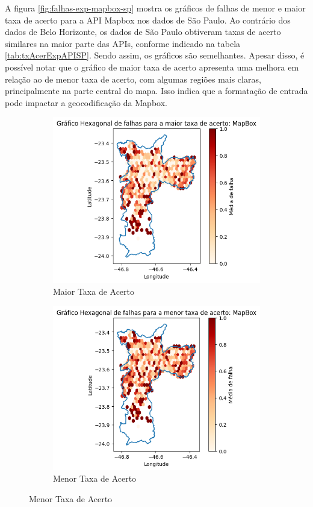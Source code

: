 A figura \ref{fig:falhas-exp-mapbox-sp} mostra os gráficos de falhas de menor e maior taxa de acerto para a API Mapbox nos dados de São Paulo. Ao contrário dos dados de Belo Horizonte, os dados de São Paulo obtiveram taxas de acerto similares na maior parte das APIs, conforme indicado na tabela \ref{tab:txAcerExpAPISP}. Sendo assim, os gráficos são semelhantes. Apesar disso, é possível notar que o gráfico de maior taxa de acerto apresenta uma melhora em relação ao de menor taxa de acerto, com algumas regiões mais claras, principalmente na parte central do mapa. Isso indica que a formatação de entrada pode impactar a geocodificação da Mapbox.

\begin{figure}[ht]
    \centering
    \begin{subfigure}[b]{0.45\textwidth}
      \includegraphics[width=\textwidth]{Figuras/expFalhasMapboxmaiorSP.png}
      \caption{Maior Taxa de Acerto}
      \label{fig:falhasmapboxSPexpMaior}
    \end{subfigure}
    \begin{subfigure}[b]{0.45\textwidth}
      \includegraphics[width=\textwidth]{Figuras/expFalhasMapboxmenorSP.png}
      \caption{Menor Taxa de Acerto}
      \label{fig:falhasmapboxSPexpMenor}
    \end{subfigure}
    

\end{figure}
